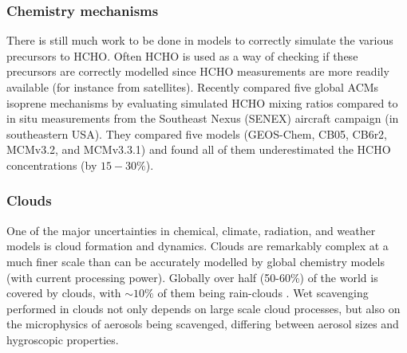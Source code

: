     
    \subsubsection{Chemistry mechanisms}
      There is still much work to be done in models to correctly simulate the various precursors to HCHO.
      Often HCHO is used as a way of checking if these precursors are correctly modelled since HCHO measurements are more readily available (for instance from satellites).
      Recently \cite{Marvin2017} compared five global ACMs isoprene mechanisms by evaluating simulated HCHO mixing ratios compared to in situ measurements from the Southeast Nexus (SENEX) aircraft campaign (in southeastern USA).
      They compared five models (GEOS-Chem, CB05, CB6r2, MCMv3.2, and MCMv3.3.1) and found all of them underestimated the HCHO concentrations (by $15 - 30\%$).
    
    \subsubsection{Clouds}
      \label{LR:sec:ModelUncertaintyClouds}
      One of the major uncertainties in chemical, climate, radiation, and weather models is cloud formation and dynamics. 
      Clouds are remarkably complex at a much finer scale than can be accurately modelled by global chemistry models (with current processing power).
      Globally over half (50-60\%) of the world is covered by clouds, with $\sim10\%$ of them being rain-clouds \citep{Kanakidou2005}.
      Wet scavenging performed in clouds not only depends on large scale cloud processes, but also on the microphysics of aerosols being scavenged, differing between aerosol sizes and hygroscopic properties.
